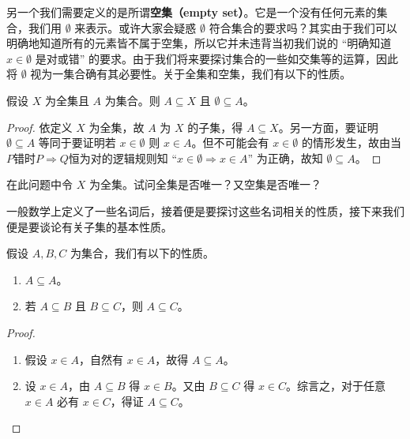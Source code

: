 另一个我们需要定义的是所谓\textbf{空集（empty set）}。它是一个没有任何元素的集合，我们用 $\emptyset$ 来表示。或许大家会疑惑 $\emptyset$ 符合集合的要求吗？其实由于我们可以明确地知道所有的元素皆不属于空集，所以它并未违背当初我们说的 “明确知道 $x \in \emptyset$ 是对或错” 的要求。由于我们将来要探讨集合的一些如交集等的运算，因此将 $\emptyset$ 视为一集合确有其必要性。关于全集和空集，我们有以下的性质。

\begin{proposition}
假设 $X$ 为全集且 $A$ 为集合。则 $A \subseteq X$ 且 $\emptyset \subseteq A$。
\end{proposition}

\begin{proof}
依定义 $X$ 为全集，故 $A$ 为 $X$ 的子集，得 $A \subseteq X$。另一方面，要证明 $\emptyset \subseteq A$ 等同于要证明若 $x \in \emptyset$ 则 $x \in A$。但不可能会有 $x \in \emptyset$ 的情形发生，故由当$P$错时$P\Rightarrow Q$恒为对的逻辑规则知 “$x \in \emptyset \Rightarrow x \in A$” 为正确，故知 $\emptyset \subseteq A$。
\end{proof}

\begin{question}
在此问题中令 $X$ 为全集。试问全集是否唯一？又空集是否唯一？
\end{question}

一般数学上定义了一些名词后，接着便是要探讨这些名词相关的性质，接下来我们便是要谈论有关子集的基本性质。

\begin{proposition}
假设 $A, B, C$ 为集合，我们有以下的性质。
\begin{enumerate}[label={(\arabic*)}]
  \item $A \subseteq A$。
  \item 若 $A \subseteq B$ 且 $B \subseteq C$，则 $A \subseteq C$。
\end{enumerate}
\end{proposition}

\begin{proof}
  \begin{enumerate}[label={(\arabic*)}]
    \item 假设 $x \in A$，自然有 $x \in A$，故得 $A \subseteq A$。
    \item 设 $x \in A$，由 $A \subseteq B$ 得 $x \in B$。又由 $B \subseteq C$ 得 $x \in C$。综言之，对于任意 $x \in A$ 必有 $x \in C$，得证 $A \subseteq C$。\qedhere
  \end{enumerate}
\end{proof}


